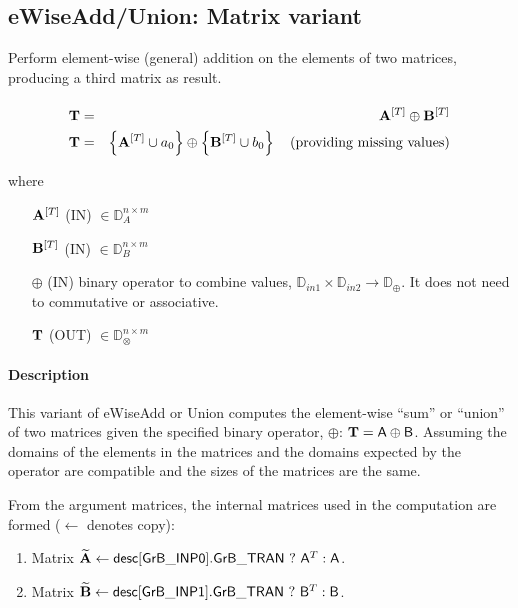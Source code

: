 \subsection{{\sf eWiseAdd/Union}: Matrix variant}

Perform element-wise (general) addition on the elements of two matrices,
producing a third matrix as result.

\paragraph{\syntax}

\begin{eqnarray*}
{\bf T} & = & {\bf A}^{[T]} \oplus {\bf B}^{[T]} \\
{\bf T} & = & \left\{ {\bf A}^{[T]}\cup a_0 \right\} \oplus \left\{ {\bf B}^{[T]} \cup b_0 \right\}  \mbox{~~~(providing missing values)}
\end{eqnarray*}

where

\begin{itemize}[leftmargin=1.1in]
    \item[${\bf A}^{[T]}$]    ({\sf IN}) $\in \mathbb{D}_{A}^{n\times m}$

    \item[${\bf B}^{[T]}$]    ({\sf IN}) $\in \mathbb{D}_{B}^{n\times m}$

    \item[$\oplus$]   ({\sf IN}) binary operator to combine values, $\mathbb{D}_{in1} \times \mathbb{D}_{in2} \rightarrow \mathbb{D}_\oplus$.  It does not need to commutative or associative.

    \item[${\bf T}$]    ({\sf OUT}) $\in \mathbb{D}_\otimes^{n\times m}$
\end{itemize}

\paragraph{Description}

This variant of {\sf eWiseAdd} or {\sf Union} computes the element-wise ``sum'' or
``union'' of two matrices given the specified binary operator, $\oplus$: 
${\bf T} = {\sf A} \oplus {\sf B}$.  Assuming the domains of the
elements in the matrices and the domains expected by the operator are compatible
and the sizes of the matrices are the same.

From the argument matrices, the internal matrices used in 
the computation are formed ($\leftarrow$ denotes copy): 
\begin{enumerate}	\item Matrix ${\bf \widetilde{A}} \leftarrow
    {\sf desc[GrB\_INP0].GrB\_TRAN} \ ? \ {\sf A}^T : {\sf A}$.

	\item Matrix ${\bf \widetilde{B}} \leftarrow
    {\sf desc[GrB\_INP1].GrB\_TRAN} \ ? \ {\sf B}^T : {\sf B}$.
\end{enumerate}

